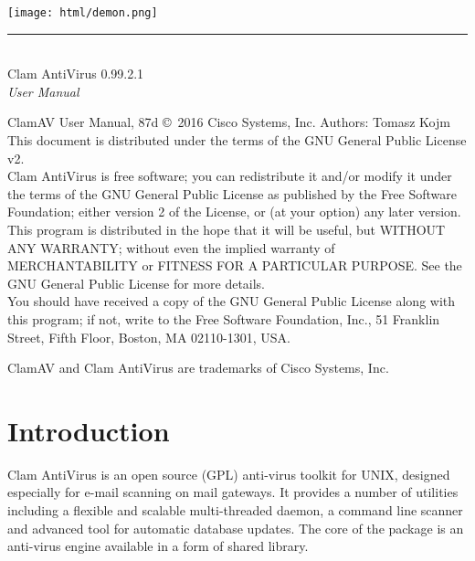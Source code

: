 \documentclass[a4paper,titlepage,12pt]{article}
\date{}
\begin{document}
    \setcounter{page}{0}

    \pagestyle{empty}
    \texttt{[image: html/demon.png]}
    \vspace{3cm}
    \begin{flushright}
	\rule[-1ex]{8cm}{3pt}\\
	\huge Clam AntiVirus 0.99.2.1\\
	\huge \emph{User Manual}\\
    \end{flushright}

    \newpage
    \pagestyle{fancy}
    \tableofcontents
    \vspace{1.0cm}

    \noindent
    \begin{boxedminipage}[b]{\textwidth}
    ClamAV User Manual,
87d
    \copyright \  2016 Cisco Systems, Inc.
    Authors: Tomasz Kojm\\
    This document is distributed under the terms of the GNU General
    Public License v2.\\

    Clam AntiVirus is free software; you can redistribute it and/or modify
    it under the terms of the GNU General Public License as published by
    the Free Software Foundation; either version 2 of the License, or
    (at your option) any later version.\\

    This program is distributed in the hope that it will be useful,
    but WITHOUT ANY WARRANTY; without even the implied warranty of
    MERCHANTABILITY or FITNESS FOR A PARTICULAR PURPOSE.  See the
    GNU General Public License for more details.\\

    You should have received a copy of the GNU General Public License
    along with this program; if not, write to the Free Software
    Foundation, Inc., 51 Franklin Street, Fifth Floor, Boston,
    MA 02110-1301, USA.
    \end{boxedminipage}

    \vspace{0.3cm}
    \noindent
    \begin{boxedminipage}[b]{\textwidth}
    ClamAV and Clam AntiVirus are trademarks of Cisco Systems, Inc.
    \end{boxedminipage}

    \newpage

    \section{Introduction}
    Clam AntiVirus is an open source (GPL) anti-virus toolkit for UNIX,
    designed especially for e-mail scanning on mail gateways. It provides
    a number of utilities including a flexible and scalable multi-threaded
    daemon, a command line scanner and advanced tool for automatic database
    updates. The core of the package is an anti-virus engine available in a
    form of shared library.
\end{document}
